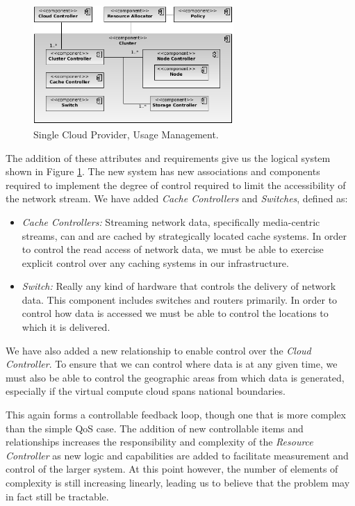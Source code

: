 \documentclass[times, 10pt,twocolumn]{article}
\begin{document}
\begin{figure}[!t]
\centering
\includegraphics[width=3in]{Single-UM}
\caption{Single Cloud Provider, Usage Management.}
\label{fig:single-um}
\end{figure}

The addition of these attributes and requirements give us the logical system shown in Figure \ref{fig:single-um}.  The new system has new associations and components required to implement the degree of control required to limit the accessibility of the network stream.  We have added \textit{Cache Controllers} and \textit{Switches}, defined as:

\begin{itemize}
\item \textit{Cache Controllers:} Streaming network data, specifically media-centric streams, can and are cached by strategically located cache systems.  In order to control the read access of network data, we must be able to exercise explicit control over any caching systems in our infrastructure.
\item \textit{Switch:} Really any kind of hardware that controls the delivery of network data.  This component includes switches and routers primarily.  In order to control how data is accessed we must be able to control the locations to which it is delivered.
\end{itemize}

We have also added a new relationship to enable control over the \textit{Cloud Controller}.  To ensure that we can control where data is at any given time, we must also be able to control the geographic areas from which data is generated, especially if the virtual compute cloud spans national boundaries.

This again forms a controllable feedback loop, though one that is more complex than the simple QoS case.  The addition of new controllable items and relationships increases the responsibility and complexity of the \textit{Resource Controller} as new logic and capabilities are added to facilitate measurement and control of the larger system.  At this point however, the number of elements of complexity is still increasing linearly, leading us to believe that the problem may in fact still be tractable.
\end{document}
